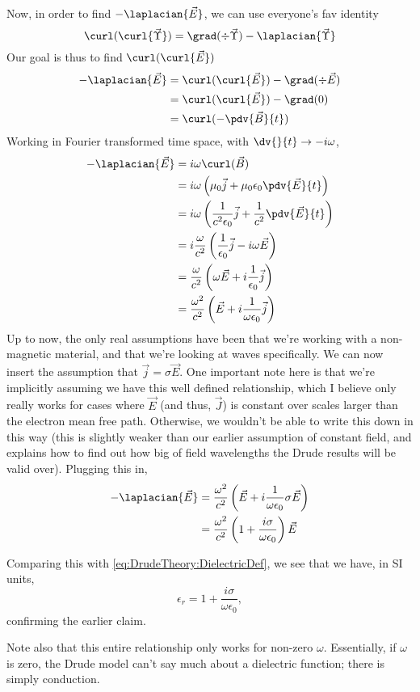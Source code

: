 \documentclass[../../main.tex]{subfiles}
\begin{document}
Now, in order to find $-\laplacian{\vec{E}}$, we can use everyone's fav identity
\begin{equation}
	\curl(\curl{\vec{\Upsilon}}) = \grad(\div{\vec{\Upsilon}}) - \laplacian{\vec{\Upsilon}}
\end{equation}
Our goal is thus to find $\curl(\curl{\vec{E}})$
\begin{align}
	 - \laplacian{\vec{E}} &= \curl(\curl{\vec{E}}) - \grad(\div{\vec{E}}) \\
	 &= \curl(\curl{\vec{E}}) - \grad(0) \\
	 &= \curl(- \pdv{\vec{B}}{t})
\end{align}
Working in Fourier transformed time space, with $\dv{}{t} \rightarrow -i \omega$, 
\begin{align}
	- \laplacian{\vec{E}} &= i\omega \curl(\vec{B}) \\ 
	&= i \omega \left(\mu_0 \vec{j} + \mu_0 \epsilon_0 \pdv{\vec{E}}{t} \right) \\
	&= i \omega \left(\frac{1}{c^2 \epsilon_0} \vec{j} + \frac{1}{c^2} \pdv{\vec{E}}{t} \right) \\ 
	&= i \frac{\omega}{c^2} \left(\frac{1}{\epsilon_0} \vec{j} - i\omega \vec{E} \right) \\
	&= \frac{\omega}{c^2} \left(\omega \vec{E} + i \frac{1}{\epsilon_0} \vec{j} \right) \\  
	&= \frac{\omega^2}{c^2} \left(\vec{E} + i \frac{1}{\omega \epsilon_0} \vec{j} \right)
\end{align}
Up to now, the only real assumptions have been that we're working with a non-magnetic material, and that we're looking at waves specifically. We can now insert the assumption that $\vec{j} = \sigma \vec{E}$. One important note here is that we're implicitly assuming we have this well defined relationship, which I believe only really works for cases where $\vec{E}$ (and thus, $\vec{J}$) is constant over scales larger than the electron mean free path. Otherwise, we wouldn't be able to write this down in this way (this is slightly weaker than our earlier assumption of constant field, and explains how to find out how big of field wavelengths the Drude results will be valid over). Plugging this in,
\begin{align}
	- \laplacian{\vec{E}} &= \frac{\omega^2}{c^2} \left(\vec{E} + i \frac{1}{\omega \epsilon_0} \sigma \vec{E} \right) \\
	&= \frac{\omega^2}{c^2} \left(1+ \frac{i \sigma}{\omega \epsilon_0} \right) \vec{E}
\end{align}

Comparing this with \eqref{eq:DrudeTheory:DielectricDef}, we see that we have, in SI units,
\begin{equation}
	\epsilon_r = 1 + \frac{i \sigma}{\omega \epsilon_0}, 
\end{equation}
confirming the earlier claim.

Note also that this entire relationship only works for non-zero $\omega$. Essentially, if $\omega$ is zero, the Drude model can't say much about a dielectric function; there is simply conduction.
\end{document}
